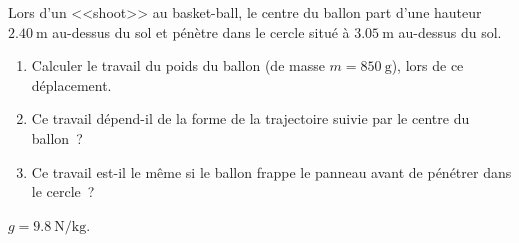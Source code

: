 Lors d'un <<shoot>> au basket-ball, le centre du ballon part d'une hauteur
$\qty{2.40}{\m}$ au-dessus du sol et pénètre dans le cercle situé à
$\qty{3.05}{\m}$ au-dessus du sol.
\begin{enumerate}
    \item Calculer le travail du poids du ballon (de masse $m=\qty{850}{\g}$),
          lors de ce déplacement.
    \item Ce travail dépend-il de la forme de la trajectoire suivie par le
          centre du ballon~?
    \item Ce travail est-il le même si le ballon frappe le panneau avant de
          pénétrer dans le cercle~?
\end{enumerate}
\begin{donnees}
    $g=\qty{9.8}{\N\per\kg}$.
\end{donnees}
